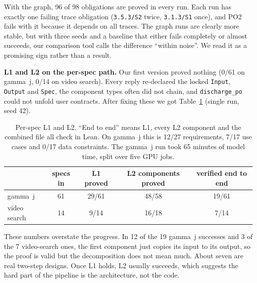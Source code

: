 \documentclass[10pt,a4paper]{article}
\newcommand{\code}[1]{\texttt{\small #1}}
\begin{document}
With the graph, 96 of 98 obligations are proved in every run. Each run has exactly one failing trace obligation (\code{3.5.3/S2} twice, \code{3.1.3/S1} once), and PO2 fails with it because it depends on all traces. The graph runs are clearly more stable, but with three seeds and a baseline that either fails completely or almost succeeds, our comparison tool calls the difference ``within noise''. We read it as a promising sign rather than a result.

\textbf{L1 and L2 on the per-spec path.} Our first version proved nothing (0/61 on gamma~j, 0/14 on video search). Every reply re-declared the locked \code{Input}, \code{Output} and \code{Spec}, the component types often did not chain, and \code{discharge\_po} could not unfold user contracts. After fixing these we got Table~\ref{tab:e2e} (single run, seed 42).

\begin{table}[h]
\centering\small
\begin{tabular}{@{}lcccc@{}}
\toprule
 & specs in & L1 proved & L2 components proved & verified end to end\\
\midrule
gamma~j & 61 & 29/61 & 48/58 & 19/61\\
video search & 14 & 9/14 & 16/18 & 7/14\\
\bottomrule
\end{tabular}
\caption{Per-spec L1 and L2. ``End to end'' means L1, every L2 component and the combined file all check in Lean. On gamma~j this is 12/27 requirements, 7/17 use cases and 0/17 data constraints. The gamma~j run took 65 minutes of model time, split over five GPU jobs.}
\label{tab:e2e}
\end{table}

These numbers overstate the progress. In 12 of the 19 gamma~j successes and 3 of the 7 video-search ones, the first component just copies its input to its output, so the proof is valid but the decomposition does not mean much. About seven are real two-step designs. Once L1 holds, L2 usually succeeds, which suggests the hard part of the pipeline is the architecture, not the code.
\end{document}
